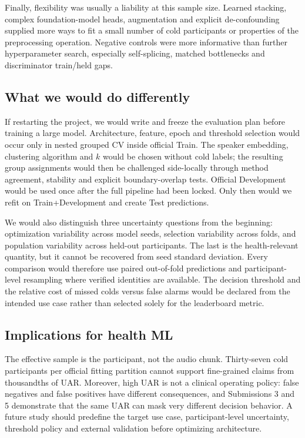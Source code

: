 Finally, flexibility was usually a liability at this sample size. Learned
stacking, complex foundation-model heads, augmentation and explicit
de-confounding supplied more ways to fit a small number of cold participants
or properties of the preprocessing operation. Negative controls were more
informative than further hyperparameter search, especially self-splicing,
matched bottlenecks and discriminator train/held gaps.

\subsection{What we would do differently}

If restarting the project, we would write and freeze the evaluation plan before
training a large model. Architecture, feature, epoch and threshold selection
would occur only in nested grouped CV inside official Train. The speaker
embedding, clustering algorithm and $k$ would be chosen without cold labels;
the resulting group assignments would then be challenged side-locally through
method agreement, stability and explicit boundary-overlap tests. Official
Development would be used once after the full pipeline had been locked. Only
then would we refit on Train+Development and create Test predictions.

We would also distinguish three uncertainty questions from the beginning:
optimization variability across model seeds, selection variability across
folds, and population variability across held-out participants. The last is
the health-relevant quantity, but it cannot be recovered from seed standard
deviation. Every comparison would therefore use paired out-of-fold predictions
and participant-level resampling where verified identities are available. The
decision threshold and the relative cost of missed colds versus false alarms
would be declared from the intended use case rather than selected solely for
the leaderboard metric.

\subsection{Implications for health ML}

The effective sample is the participant, not the audio chunk. Thirty-seven
cold participants per official fitting partition cannot support fine-grained
claims from thousandths of UAR. Moreover, high UAR is not a clinical operating
policy: false negatives and false positives have different consequences, and
Submissions 3 and 5 demonstrate that the same UAR can mask very different
decision behavior. A future study should predefine the target use case,
participant-level uncertainty, threshold policy and external validation before
optimizing architecture.

